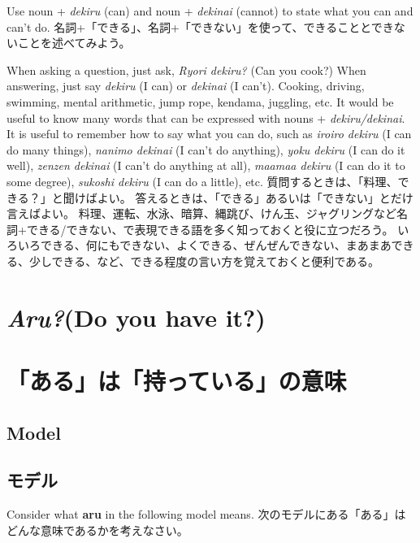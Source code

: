 \documentclass[uplatex,dvipdfmx,b5paper,english,10pt]{jsbook}
\begin{document}
\begin{toiquestion}
\ifEnglish
Use noun + {\it dekiru\/} (can) and noun + {\it dekinai\/} (cannot) to state what you can and can't do.
\else
名詞+「できる」、名詞+「できない」を使って、できることとできないことを述べてみよう。
\fi
\end{toiquestion}
\begin{toianswer} %
\ifEnglish
When asking a question, just ask, {\it Ryori dekiru?\/} (Can you cook?)
When answering, just say {\it dekiru\/} (I can) or {\it dekinai\/} (I can't).
Cooking, driving, swimming, mental arithmetic, jump rope, kendama, juggling, etc. It would be useful to know many words that can be expressed with nouns + {\it dekiru/dekinai\/}.
It is useful to remember how to say what you can do, such as {\it iroiro dekiru\/} (I can do many things), {\it nanimo dekinai\/} (I can't do anything), {\it yoku dekiru\/} (I can do it well), {\it zenzen dekinai\/} (I can't do anything at all), {\it maamaa dekiru\/} (I can do it to some degree), {\it sukoshi dekiru\/} (I can do a little), etc.
\else
質問するときは、「料理、できる？」と聞けばよい。
答えるときは、「できる」あるいは「できない」とだけ言えばよい。
料理、運転、水泳、暗算、縄跳び、けん玉、ジャグリングなど名詞+できる/できない、で表現できる語を多く知っておくと役に立つだろう。
いろいろできる、何にもできない、よくできる、ぜんぜんできない、まあまあできる、少しできる、など、できる程度の言い方を覚えておくと便利である。
\fi
\end{toianswer}

%

\ifEnglish
\section{{\it Aru?\/}(Do you have it?)}
\else
  \section{「ある」は「持っている」の意味}
\fi

\ifEnglish
\subsection{Model}
\else
\subsection{モデル}
\fi
\begin{toiquestion}
\ifEnglish
Consider what {\bf aru\/} in the following model means.
\else
次のモデルにある「ある」はどんな意味であるかを考えなさい。
\fi
\end{toiquestion}
\end{document}
